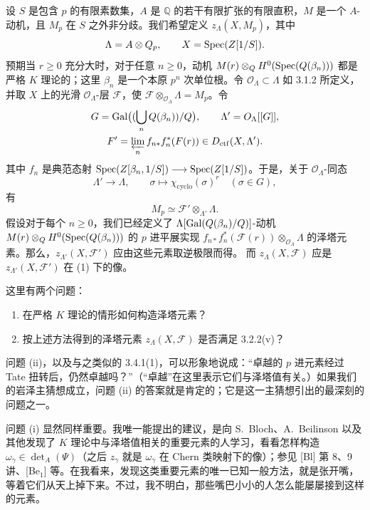 设 $S$ 是包含 $p$ 的有限素数集，$A$ 是 $\mathbb Q$ 的若干有限扩张的有限直积，$M$ 是一个 $A$-动机，且 $M_p$ 在 $S$ 之外非分歧。我们希望定义 $z_\Lambda(X,M_p)$，其中
\[
 \Lambda=A\otimes Q_p,\qquad X=\operatorname{Spec}(Z[1/S]).
\]
预期当 $r\ge0$ 充分大时，对于任意 $n\ge0$，动机
$M(r)\otimes_{Q}H^0(\operatorname{Spec}(Q(\beta_n)))$ 都是严格 $K$ 理论的；这里 $\beta_n$ 是一个本原 $p^n$ 次单位根。令 $\mathcal O_\Lambda\subset\Lambda$ 如 3.1.2 所定义，并取 $X$ 上的光滑 $\mathcal O_\Lambda$-层 $\mathcal F$，使 $\mathcal F\otimes_{\mathcal O_\Lambda}\Lambda=M_p$。令
\[
 \begin{gathered}
 G=\operatorname{Gal}\bigl((\bigcup_nQ(\beta_n))/Q\bigr),\qquad
 \Lambda'=O_\Lambda[[G]],\\
 F'=\varprojlim_n f_{n*}f_n^*(F(r))\in D_{\mathrm{ctf}}(X,\Lambda').
\end{gathered}
\]
其中 $f_n$ 是典范态射
$\operatorname{Spec}(Z[\beta_n,1/S])\longrightarrow\operatorname{Spec}(Z[1/S])$。于是，关于 $\mathcal O_\Lambda$-同态
\[
 \Lambda'\longrightarrow\Lambda,\qquad
 \sigma\longmapsto\chi_{\mathrm{cyclo}}(\sigma)^r\quad(\sigma\in G),
\]
有
\begin{equation*}
 M_p\simeq\mathcal F'\otimes_{\Lambda'}\Lambda.\tag{1}
\end{equation*}
假设对于每个 $n\ge0$，我们已经定义了
$\Lambda[\operatorname{Gal}(Q(\beta_n)/Q)]$-动机
$M(r)\otimes_{Q}H^0(\operatorname{Spec}(Q(\beta_n)))$ 的 $p$ 进平展实现
$f_{n*}f_n^*(\mathcal F(r))\otimes_{\mathcal O_\Lambda}\Lambda$ 的泽塔元素。那么，$z_{\Lambda'}(X,\mathcal F')$ 应由这些元素取逆极限而得。
而 $z_\Lambda(X,\mathcal F)$ 应是 $z_{\Lambda'}(X,\mathcal F')$ 在 (1) 下的像。

这里有两个问题：
\begin{enumerate}[label=(\roman*)]
\item 在严格 $K$ 理论的情形如何构造泽塔元素？
\item 按上述方法得到的泽塔元素 $z_\Lambda(X,\mathcal F)$ 是否满足 3.2.2(v)？
\end{enumerate}
问题 (ii)，以及与之类似的 3.4.1(1)，可以形象地说成：“卓越的 $p$ 进元素经过 Tate 扭转后，仍然卓越吗？”（“卓越”在这里表示它们与泽塔值有关。）如果我们的岩泽主猜想成立，问题 (ii) 的答案就是肯定的；它是这一主猜想引出的最深刻的问题之一。

问题 (i) 显然同样重要。我唯一能提出的建议，是向 S.~Bloch、A.~Beilinson 以及其他发现了 $K$ 理论中与泽塔值相关的重要元素的人学习，看看怎样构造 $\omega_\gamma\in\det_A(\Psi)$（之后 $z_\gamma$ 就是 $\omega_\gamma$ 在 Chern 类映射下的像）；参见 [Bl] 第 8、9 讲、[Be$_1$] 等。在我看来，发现这类重要元素的唯一已知一般方法，就是张开嘴，等着它们从天上掉下来。不过，我不明白，那些嘴巴小小的人怎么能屡屡接到这样的元素。

